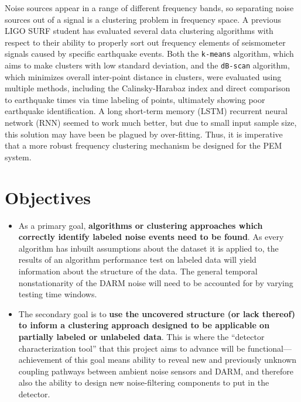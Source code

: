 \documentclass[colorlinks=true,pdfstartview=FitV,linkcolor=blue,
            citecolor=red,urlcolor=magenta]{ligodoc}
\begin{document}
Noise sources appear in a range of different frequency bands, so separating noise sources out of a signal is a clustering problem in frequency space.
A previous LIGO SURF student has evaluated several data clustering algorithms with respect to their ability to properly sort out frequency elements of seismometer signals caused by specific earthquake events\cite{roxana}.
Both the \texttt{k-means} algorithm, which aims to make clusters with low standard deviation, and the \texttt{dB-scan} algorithm, which minimizes overall inter-point distance in clusters, were evaluated using multiple methods, including the Calinsky-Harabaz  index and direct comparison to earthquake times via time labeling of points, ultimately showing poor earthquake identification.
A long short-term memory (LSTM) recurrent neural network (RNN) seemed to work much better, but due to small input sample size, this solution may have been be plagued by over-fitting.
Thus, it is imperative that a more robust frequency clustering mechanism be designed for the PEM system.

\section{Objectives}
\begin{itemize}
\item
As a primary goal, \textbf{algorithms or clustering approaches which correctly identify labeled noise events need to be found}.
As every algorithm has inbuilt assumptions about the dataset it is applied to, the results of an algorithm performance test on labeled data will yield information about the structure of the data.
The general temporal nonstationarity of the DARM noise will need to be accounted for by varying testing time windows.
\item
The secondary goal is to \textbf{use the uncovered structure (or lack thereof) to inform a clustering approach designed to be applicable on partially labeled or unlabeled data}.
This is where the ``detector characterization tool'' that this project aims to advance will be functional---achievement of this goal means ability to reveal new and previously unknown coupling pathways between ambient noise sensors and DARM, and therefore also the ability to design new noise-filtering components to put in the detector.
\end{itemize}
\end{document}
